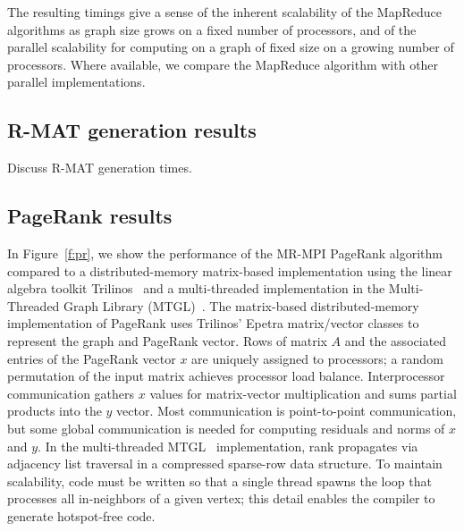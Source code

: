 The resulting timings give a sense of the inherent scalability of the
MapReduce algorithms as graph size grows on a fixed number of
processors, and of the parallel scalability for computing on a graph
of fixed size on a growing number of processors.  Where available, we
compare the MapReduce algorithm with other parallel implementations.

\subsection{R-MAT generation results}
Discuss R-MAT generation times.

\subsection{PageRank results}

In Figure~\ref{f:pr}, we show the performance of the MR-MPI PageRank algorithm
compared to a
distributed-memory matrix-based implementation using the linear
algebra toolkit Trilinos~\cite{Trilinos-Overview} 
and a multi-threaded
implementation
in the Multi-Threaded Graph Library (MTGL)~\cite{MTGL}.
The matrix-based distributed-memory implementation of PageRank
uses Trilinos' Epetra matrix/vector classes to represent the graph and
PageRank vector.
Rows of matrix $A$ and the associated entries of the PageRank vector $x$
are uniquely assigned to processors; a random permutation of the input
matrix achieves processor load balance.
Interprocessor communication gathers $x$ values for matrix-vector
multiplication and sums partial products into the $y$ vector.
Most communication is point-to-point communication,
but some global communication is needed for computing
residuals and norms of $x$ and $y$.
In the multi-threaded MTGL~\cite{MTGL} implementation,
rank propagates via adjacency list traversal
in a compressed sparse-row data structure.
To maintain scalability, code must
be written so that a single thread spawns the loop that processes all
in-neighbors of a given vertex; this detail enables the compiler to generate
hotspot-free code.

